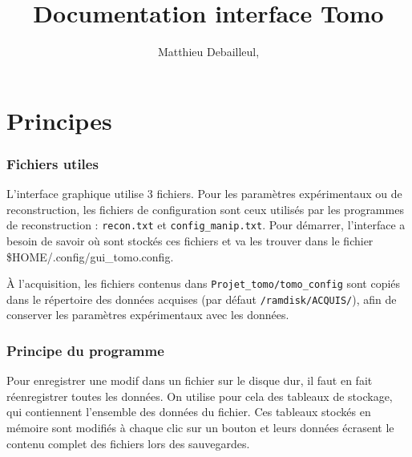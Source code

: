\documentclass[	french,DIV=calc,%
							paper=a4,%
							fontsize=11pt,%
							twocolumn]{scrartcl}	 					%
\title{Documentation interface Tomo}					%
\author{Matthieu Debailleul, }											%
\date{}																				%
\newcommand{\code}[1]{\texttt{#1}}
\newcommand{\initial}[1]{%
     \lettrine[lines=3,lhang=0.3,nindent=0em]{
     				\color{DarkGoldenrod}
     				{\textsf{#1}}}{}}
\begin{document}
\maketitle
\thispagestyle{fancy} 			%


\section{Principes}
\subsubsection*{Fichiers utiles}
L'interface graphique utilise 3 fichiers. Pour les paramètres expérimentaux ou de reconstruction,  les fichiers de configuration sont ceux utilisés par  les programmes de reconstruction :  \code{recon.txt} et  \code{config\_manip.txt}.
Pour démarrer, l'interface a besoin de savoir où sont stockés ces fichiers et va les trouver dans le fichier  \$HOME/.config/gui\_tomo.config.



À l'acquisition, les fichiers contenus dans \code{Projet\_tomo/tomo\_config} sont copiés dans le répertoire des données acquises (par défaut \code{/ramdisk/ACQUIS/}), afin de conserver les paramètres expérimentaux avec les données. 
\subsubsection*{Principe du programme}
Pour enregistrer une modif dans un fichier sur le disque dur, il faut en fait réenregistrer toutes les données.
On utilise pour cela des tableaux de stockage, qui contiennent l'ensemble des données du fichier. Ces tableaux stockés en mémoire sont modifiés à chaque clic sur un bouton et leurs données écrasent le contenu complet  des fichiers lors des sauvegardes.
\end{document}
